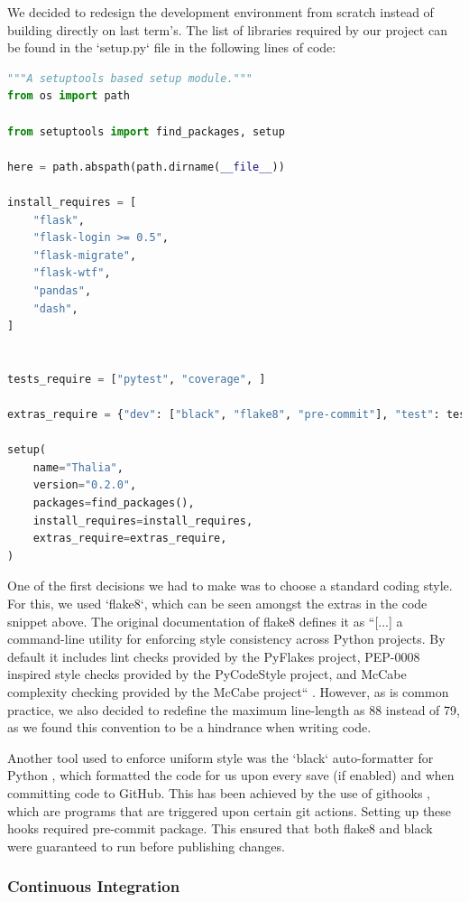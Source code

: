 \documentclass[main.tex]{subfiles}
\begin{document}
We decided to redesign the development environment from scratch instead of building directly on last term's. The list of libraries required by our project can be found in the `setup.py` file in the following lines of code:

\begin{lstlisting}[language=Python, caption=setup.py - Development environment, label=lst:Development_env]
"""A setuptools based setup module."""
from os import path

from setuptools import find_packages, setup

here = path.abspath(path.dirname(__file__))

install_requires = [
    "flask",
    "flask-login >= 0.5",
    "flask-migrate",
    "flask-wtf",
    "pandas",
    "dash",
]


tests_require = ["pytest", "coverage", ]

extras_require = {"dev": ["black", "flake8", "pre-commit"], "test": tests_require}

setup(
    name="Thalia",
    version="0.2.0",
    packages=find_packages(),
    install_requires=install_requires,
    extras_require=extras_require,
)
\end{lstlisting}

One of the first decisions we had to make was to choose a standard coding style. For this, we used `flake8`, which can be seen amongst the extras in the code snippet above. The original documentation of flake8 defines it as ``[...] a command-line utility for enforcing style consistency across Python projects. By default it includes lint checks provided by the PyFlakes project, PEP-0008 inspired style checks provided by the PyCodeStyle project, and McCabe complexity checking provided by the McCabe project`` \cite{flake8}. However, as is common practice, we also decided to redefine the maximum line-length as 88 instead of 79, as we found this convention to be a hindrance when writing code.

Another tool used to enforce uniform style was the `black` auto-formatter for Python \cite{black}, which formatted the code for us upon every save (if enabled) and when committing code to GitHub. This has been achieved by the use of githooks \cite{githooks}, which are programs that are triggered upon certain git actions. Setting up these hooks required pre-commit package. This ensured that both flake8 and black were guaranteed to run before publishing changes.


\subsubsection{Continuous Integration}
\label{Continuous Integration}
\end{document}
